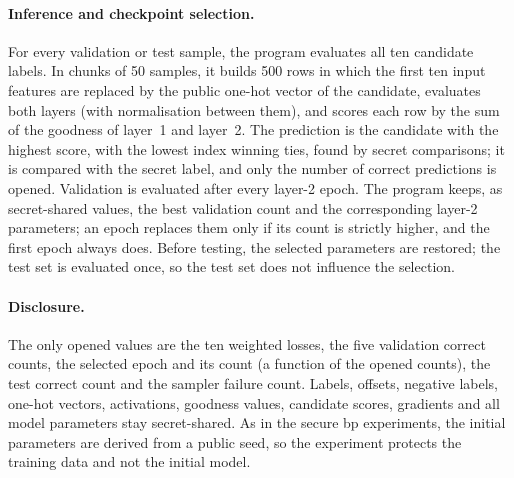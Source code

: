\paragraph{Inference and checkpoint selection.} For every validation or test sample, the program evaluates all ten candidate labels. In chunks of 50 samples, it builds 500 rows in which the first ten input features are replaced by the public one-hot vector of the candidate, evaluates both layers (with normalisation between them), and scores each row by the sum of the goodness of layer~1 and layer~2. The prediction is the candidate with the highest score, with the lowest index winning ties, found by secret comparisons; it is compared with the secret label, and only the number of correct predictions is opened. Validation is evaluated after every layer-2 epoch. The program keeps, as secret-shared values, the best validation count and the corresponding layer-2 parameters; an epoch replaces them only if its count is strictly higher, and the first epoch always does. Before testing, the selected parameters are restored; the test set is evaluated once, so the test set does not influence the selection.

\paragraph{Disclosure.} The only opened values are the ten weighted losses, the five validation correct counts, the selected epoch and its count (a function of the opened counts), the test correct count and the sampler failure count. Labels, offsets, negative labels, one-hot vectors, activations, goodness values, candidate scores, gradients and all model parameters stay secret-shared. As in the secure \ac{bp} experiments, the initial parameters are derived from a public seed, so the experiment protects the training data and not the initial model.

